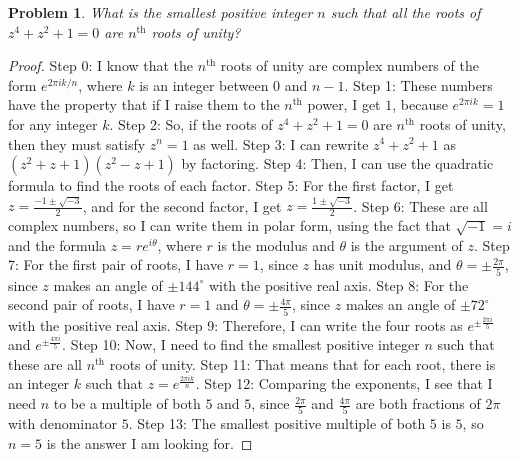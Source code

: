 \documentclass{article}
\newtheorem{theorem}{Problem}
\begin{document}
\begin{theorem}
What is the smallest positive integer $n$ such that all the roots of $z^4 + z^2 + 1 = 0$ are $n^{\text{th}}$ roots of unity?
\end{theorem}

\begin{proof}
Step 0: I know that the $n^{\text{th}}$ roots of unity are complex numbers of the form $e^{2\pi ik/n}$, where $k$ is an integer between $0$ and $n-1$.
Step 1: These numbers have the property that if I raise them to the $n^{\text{th}}$ power, I get $1$, because $e^{2\pi ik} = 1$ for any integer $k$.
Step 2: So, if the roots of $z^4 + z^2 + 1 = 0$ are $n^{\text{th}}$ roots of unity, then they must satisfy $z^n = 1$ as well.
Step 3: I can rewrite $z^4 + z^2 + 1$ as $(z^2 + z + 1)(z^2 - z + 1)$ by factoring.
Step 4: Then, I can use the quadratic formula to find the roots of each factor.
Step 5: For the first factor, I get $z = \frac{-1 \pm \sqrt{-3}}{2}$, and for the second factor, I get $z = \frac{1 \pm \sqrt{-3}}{2}$.
Step 6: These are all complex numbers, so I can write them in polar form, using the fact that $\sqrt{-1} = i$ and the formula $z = re^{i\theta}$, where $r$ is the modulus and $\theta$ is the argument of $z$.
Step 7: For the first pair of roots, I have $r = 1$, since $z$ has unit modulus, and $\theta = \pm \frac{2\pi}{5}$, since $z$ makes an angle of $\pm 144^\circ$ with the positive real axis.
Step 8: For the second pair of roots, I have $r = 1$ and $\theta = \pm \frac{4\pi}{5}$, since $z$ makes an angle of $\pm 72^\circ$ with the positive real axis.
Step 9: Therefore, I can write the four roots as $e^{\pm \frac{2\pi i}{5}}$ and $e^{\pm \frac{4\pi i}{5}}$.
Step 10: Now, I need to find the smallest positive integer $n$ such that these are all $n^{\text{th}}$ roots of unity.
Step 11: That means that for each root, there is an integer $k$ such that $z = e^{\frac{2\pi i k}{n}}$.
Step 12: Comparing the exponents, I see that I need $n$ to be a multiple of both $5$ and $5$, since $\frac{2\pi}{5}$ and $\frac{4\pi}{5}$ are both fractions of $2\pi$ with denominator $5$.
Step 13: The smallest positive multiple of both $5$ is $5$, so $n = 5$ is the answer I am looking for.
\end{proof}
\end{document}
